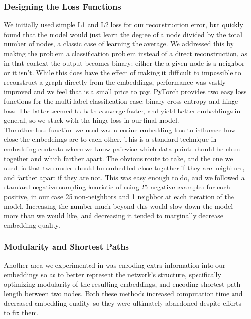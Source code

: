 \documentclass[12pt,twoside]{report}
\begin{document}
\subsubsection{Designing the Loss Functions}

We initially used simple L1 and L2 loss for our reconstruction error, but quickly found that the model would just learn the degree of a node divided by the total number of nodes, a classic case of learning the average. We addressed this by making the problem a classification problem instead of a direct reconstruction, as in that context the output becomes binary: either the a given node is a neighbor or it isn't. While this does have the effect of making it difficult to impossible to reconstruct a graph directly from the embeddings, performance was vastly improved and we feel that is a small price to pay. PyTorch provides two easy loss functions for the multi-label classification case: binary cross entropy and hinge loss. The latter seemed to both converge faster, and yield better embeddings in general, so we stuck with the hinge loss in our final model. \\

The other loss function we used was a cosine embedding loss to influence how close the embeddings are to each other. This is a standard technique in embedding contexts where we know pairwise which data points should be close together and which farther apart. The obvious route to take, and the one we used, is that two nodes should be embedded close together if they are neighbors, and farther apart if they are not. This was easy enough to do, and we followed a standard negative sampling heuristic of using 25 negative examples for each positive, in our case 25 non-neighbors and 1 neighbor at each iteration of the model. Increasing the number much beyond this would slow down the model more than we would like, and decreasing it tended to marginally decrease embedding quality. \\

\subsubsection{Modularity and Shortest Paths}

Another area we experimented in was encoding extra information into our embeddings so as to better represent the network's structure, specifically optimizing modularity of the resulting embeddings, and encoding shortest path length between two nodes. Both these methods increased computation time and decreased embedding quality, so they were ultimately abandoned despite efforts to fix them. \\
\end{document}
